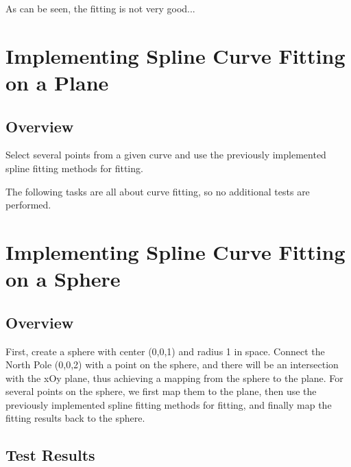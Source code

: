 \documentclass[a4paper]{article}
\begin{document}
As can be seen, the fitting is not very good...

\section{Implementing Spline Curve Fitting on a Plane}

\subsection{Overview}

Select several points from a given curve and use the previously implemented spline fitting methods for fitting.

The following tasks are all about curve fitting, so no additional tests are performed.

\section{Implementing Spline Curve Fitting on a Sphere}

\subsection{Overview}

First, create a sphere with center (0,0,1) and radius 1 in space. Connect the North Pole (0,0,2) with a point on the sphere, and there will be an intersection with the xOy plane, thus achieving a mapping from the sphere to the plane. For several points on the sphere, we first map them to the plane, then use the previously implemented spline fitting methods for fitting, and finally map the fitting results back to the sphere.

\subsection{Test Results}
\end{document}
